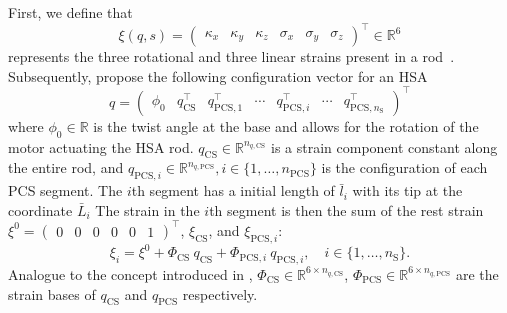 First, we define that 
\begin{equation}
    \xi(q,s) = \begin{pmatrix} \kappa_x & \kappa_y & \kappa_z & \sigma_x & \sigma_y & \sigma_z \end{pmatrix}^\top \in \mathbb{R}^6
\end{equation}
represents the three rotational and three linear strains present in a rod~\citep{renda2018discrete}. Subsequently, propose the following configuration vector for an \gls{HSA}
\begin{equation}
    q = \begin{pmatrix}
        \phi_0 & q_\mathrm{CS}^\top & q_{\mathrm{PCS},1}^\top & \cdots & q_{\mathrm{PCS},i}^\top & \cdots & q_{\mathrm{PCS},n_\mathrm{S}}^\top
    \end{pmatrix}^\top%
\end{equation}
where $\phi_0 \in \mathbb{R}$ is the twist angle at the base and allows for the rotation of the motor actuating the \gls{HSA} rod. $q_\mathrm{CS} \in \mathbb{R}^{n_{q,\mathrm{CS}}}$ is a strain component constant along the entire rod, and $q_{\mathrm{PCS},i} \in \mathbb{R}^{n_{q,\mathrm{PCS}}}, i \in \{1, \dots, n_\mathrm{PCS}\}$ is the configuration of each \gls{PCS} segment. The $i$th segment has a initial length of $\bar{l}_i$ with its tip at the coordinate $\bar{L}_i$
%
The strain in the $i$th segment is then the sum of the rest strain $\xi^0 = \begin{pmatrix} 0 & 0 & 0 & 0 & 0 & 1\end{pmatrix}^\top$, $\xi_\mathrm{CS}$, and $\xi_{\mathrm{PCS},i}$:
\begin{equation}
    \xi_i = \xi^0 + \Phi_\mathrm{CS} \: q_\mathrm{CS} + \Phi_{\mathrm{PCS},i} \: q_{\mathrm{PCS},i}, \quad i \in \{1,\dots, n_\mathrm{S}\}.
\end{equation}
Analogue to the concept introduced in \citep{renda2020geometric}, $\Phi_\mathrm{CS} \in \mathbb{R}^{6 \times n_{q,\mathrm{CS}}}$, $\Phi_\mathrm{PCS} \in \mathbb{R}^{6 \times n_{q,\mathrm{PCS}}}$ are the strain bases of $q_\mathrm{CS}$ and $q_\mathrm{PCS}$ respectively.

